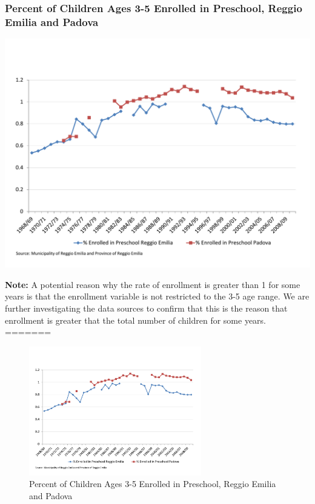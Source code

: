 \documentclass[static]{JJH-Beamer_PAGENOS}
\begin{document}
\begin{frame}
\frametitle{Percent of Children Ages 3-5 Enrolled in Preschool, Reggio Emilia and Padova}

\begin{center}
\includegraphics[scale=0.33]{../../output/image/Enrollement_Preschool_age3-5.pdf}
\end{center}
\tiny{\textbf{Note:} A potential reason why the rate of enrollment is greater than 1 for some years is that the enrollment variable is not restricted to the 3-5 age range. We are further investigating the data sources to confirm that this is the reason that enrollment is greater that the total number of children for some years.}
=======
\centering
\begin{figure}[H]
\caption{Percent of Children Ages 3-5 Enrolled in Preschool, Reggio Emilia and Padova}
\includegraphics[width=0.67\textwidth]{../../output/image/Enrollement_Preschool_age3-5.pdf}
\end{figure}

\end{frame}
\end{document}
